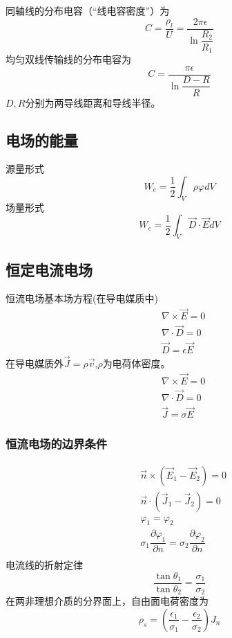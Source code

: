 \documentclass{ctexart}
\begin{document}
同轴线的分布电容（“线电容密度”）为
\begin{equation}
    C=\dfrac{\rho_l}{U}=\dfrac{2 \pi \epsilon}{\ln \dfrac{R_2}{R_1}}
\end{equation}
均匀双线传输线的分布电容为
\begin{equation}
    C=\dfrac{\pi \epsilon}{\ln \dfrac{D-R}{R}}
\end{equation}
$D,R$分别为两导线距离和导线半径。
\subsection{电场的能量}
源量形式
\begin{equation}
    W_e=\dfrac{1}{2}\int_V \rho \varphi dV
\end{equation}
场量形式
\begin{equation}
    W_e=\dfrac{1}{2}\int_V \vec{D}\cdot \vec{E}dV
\end{equation}
\subsection{恒定电流电场}
恒流电场基本场方程(在导电媒质中)
\begin{align}
    &\nabla \times \vec{E}=0\\
    &\nabla \cdot \vec{D}=0\\
    &\vec{D}=\epsilon\vec{E}
\end{align}
在导电媒质外$\vec{J}=\rho \vec{v}$,$\rho$为电荷体密度。
\begin{align}
    &\nabla \times \vec{E}=0\\
    &\nabla \cdot \vec{D}=0\\
    &\vec{J}=\sigma \vec{E}
\end{align}
\subsubsection{恒流电场的边界条件}
\begin{align}
    &\vec{n}\times (\vec{E}_1-\vec{E}_2)=0\\
    &\vec{n}\cdot  (\vec{J}_1-\vec{J}_2)=0\\
    &\varphi_1=\varphi_2\\
    &\sigma_1 \dfrac{\partial \varphi_1}{\partial n}=\sigma_2 \dfrac{\partial \varphi_2}{\partial n}\\
\end{align}
电流线的折射定律
\begin{equation}
    \dfrac{\tan \theta_1}{\tan \theta_2}=\dfrac{\sigma_1}{\sigma_2}
\end{equation}
在两非理想介质的分界面上，自由面电荷密度为
\begin{equation}
    \rho_s=(\dfrac{\epsilon_1}{\sigma_1}-\dfrac{\epsilon_2}{\sigma_2})J_n
\end{equation}
\end{document}
